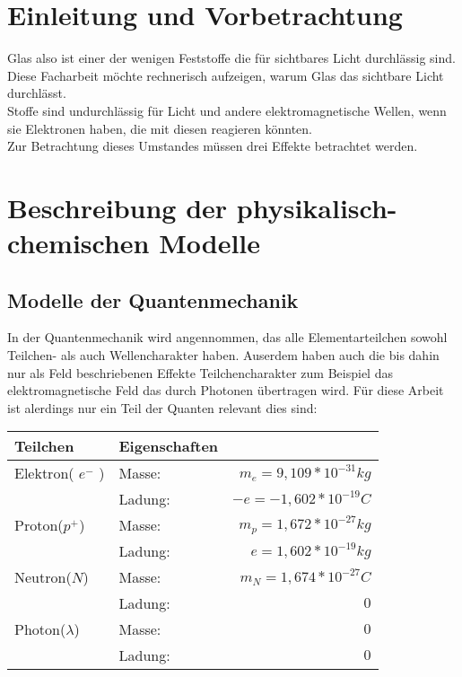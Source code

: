 \documentclass[11pt,a4paper,oneside]{report}
\begin{document}
\renewcommand{\contentsname}{Inhaltsverzeichnis}
\renewcommand{\bibname}{Quellen}


\tableofcontents

\chapter{Einleitung und Vorbetrachtung}

Glas also  ist einer der wenigen Feststoffe die für sichtbares Licht durchlässig sind. Diese Facharbeit möchte rechnerisch aufzeigen, warum Glas das sichtbare Licht durchlässt.
\\Stoffe sind undurchlässig für Licht und andere elektromagnetische Wellen, wenn sie Elektronen haben, die mit diesen reagieren könnten.
\\Zur Betrachtung dieses Umstandes müssen drei Effekte betrachtet werden. \cite{pape99}

\chapter{Beschreibung der physikalisch-chemischen Modelle}

\section{Modelle der Quantenmechanik}
In der Quantenmechanik wird angennommen, das alle Elementarteilchen sowohl Teilchen- als auch Wellencharakter haben. Auserdem haben auch die bis dahin nur als Feld beschriebenen Effekte Teilchencharakter zum Beispiel das elektromagnetische Feld das durch Photonen übertragen wird.
Für diese Arbeit ist alerdings nur ein Teil der Quanten relevant dies sind:
\begin{tabular}{|l|lr|} \hline
Teilchen 				& Eigenschaften 	&  						\\  \hline
Elektron( $e^-$ ) 		& Masse: 			& $m_e=9,109*10^{-31}kg$	\\
					& Ladung: 		& $-e=-1,602*10^{-19}C$	\\ \hline
Proton($p^+$) 		& Masse: 			& $m_p=1,672*10^{-27}kg$ 	\\
 					& Ladung: 		& $e=1,602*10^{-19}kg$	\\ \hline 
Neutron($N$)			& Masse:			& $m_N=1,674*10^{-27}C$	\\ 
					& Ladung:		& $0$					\\ \hline
Photon($ \lambda $) 	& Masse: 			& $0$					\\ 
					&Ladung:			& $0$					\\ \hline
\end{tabular}
\end{document}
